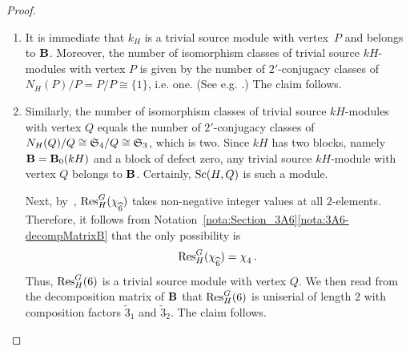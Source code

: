         
\begin{proof}
\begin{enumerate}[label={\rm(\alph*)}] 
    \item It is immediate that $k_H$ is a trivial source module with vertex~$P$ and belongs to ${\mathbf{B}}$. Moreover, the number of isomorphism classes of trivial source $kH$-modules with vertex $P$
    is given by the number of $2'$-conjugacy classes of  $N_H(P)/P=P/P\cong \{1\}$, i.e. one. (See e.g. \cite[Theorem~4.6(c)]{LasSurvey}.) The claim follows. 
    \item Similarly, the number of 
     isomorphism classes of trivial source $kH$-modules with vertex $Q$ equals the number of $2'$-conjugacy classes of   $N_H(Q)/Q\cong {\mathfrak{S}}_4/Q\cong {\mathfrak{S}}_3$, which is two. Since $kH$ has two blocks, namely ${\mathbf{B}}={\mathbf{B}}_0(kH)$ and a block of defect zero, any trivial source $kH$-module with vertex $Q$ belongs to ${\mathbf{B}}$.  
     Certainly, $\operatorname{Sc}(H,Q)$ is such a module.
     \par
    Next, by~\cite[II, Lemma 12.6(ii)]{LandrockBook},  $\operatorname{Res}^{G}_{H}(\chi^{}_{\widehat{6}})$ takes non-negative integer values at all $2$-elements. Therefore, it follows from Notation~\ref{nota:Section_3A6}\ref{nota:3A6-decompMatrixB} that the only possibility is 
    \[
        \operatorname{Res}^{G}_{H}(\chi^{}_{\widehat{6}})=\chi^{}_{4}\,.
    \]
    Thus, $\operatorname{Res}^{G}_{H}(6)$ is a trivial source module with vertex $Q$. 
    We then read from the decomposition matrix of ${\mathbf{B}}$ that $\operatorname{Res}^{G}_{H}(6)$ is uniserial of length $2$ with composition factors $\widetilde{3}_1$ and $\widetilde{3}_2$. The claim follows. 
    

\end{enumerate}
\end{proof}
